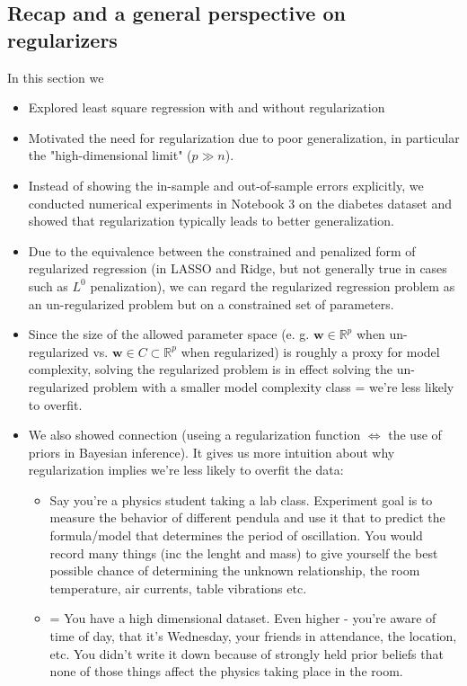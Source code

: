 \documentclass[norsk,a4paper,11pt]{article}
\begin{document}
\subsection{Recap and a general perspective on regularizers}
In this section we
\begin{itemize}
	\item Explored least square regression with and without regularization
	\item Motivated the need for regularization due to poor generalization, in particular the "high-dimensional limit" ($p \gg n$).
	\item Instead of showing the in-sample and out-of-sample errors explicitly, we conducted numerical experiments in Notebook 3 on the diabetes dataset and showed that regularization typically leads to better generalization.
	\item Due to the equivalence between the constrained and penalized form of regularized regression (in LASSO and Ridge, but not generally true in cases such as $L^0$ penalization), we can regard the regularized regression problem as an un-regularized problem but on a constrained set of parameters. 
	\item Since the size of the allowed parameter space (e. g. $\bm{w} \in \mathbb{R}^p$ when un-regularized vs. $\bm{w} \in C \subset \mathbb{R}^p$ when regularized) is roughly a proxy for model complexity, solving the regularized problem is in effect solving the un-regularized problem with a smaller model complexity class = we're less likely to overfit.
	\item We also showed connection (useing a regularization function $\Leftrightarrow$ the use of priors in Bayesian inference). It gives us more intuition about why regularization implies we're less likely to overfit the data: 
	{\tiny
	\begin{itemize}
		\item Say you're a physics student taking a lab class. Experiment goal is to measure the behavior of different pendula and use it that to predict the formula/model that determines the period of oscillation. You would record many things (inc the lenght and mass) to give yourself the best possible chance of determining the unknown relationship, the room temperature, air currents, table vibrations etc. 
		\item = You have a high dimensional dataset. Even higher - you're aware of time of day, that it's Wednesday, your friends in attendance, the location, etc. You didn't write it down because of strongly held prior beliefs that none of those things affect the physics taking place in the room. 

\end{itemize}}
\end{itemize}
\end{document}
